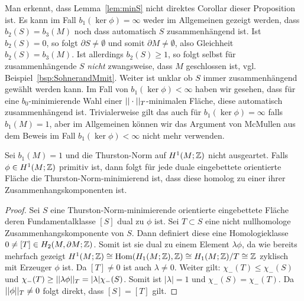 \begin{bem}
    Man erkennt, dass Lemma~\ref{lem:minS} nicht direktes Corollar dieser Proposition ist. Es kann im Fall $b_1(\ker\phi)=\infty$ weder im Allgemeinen gezeigt werden, dass $b_2(S)=b_3(M)$ noch dass automatisch $S$ zusammenhängend ist. Ist $b_2(S)=0$, so folgt $\partial S \neq \emptyset$ und somit $\partial M \neq \emptyset$, also Gleichheit $b_2(S)=b_3(M)$. Ist allerdings $b_2(S)\geq 1$, so folgt selbst für zusammenhängende $S$ \emph{nicht} zwangsweise, dass $M$ geschlossen ist, vgl.\,Beispiel~\ref{bsp:SohnerandMmit}. Weiter ist unklar ob $S$ immer zusammenhängend gewählt werden kann. Im Fall von $b_1(\ker\phi)<\infty$ haben wir gesehen, dass für eine $b_0$-minimierende Wahl einer $||\cdot||_T$-minimalen Fläche, diese automatisch zusammenhängend ist. Trivialerweise gilt das auch für $b_1(\ker\phi)=\infty$ falls $b_1(M)=1$, aber im Allgemeinen können wir das Argument von McMullen aus dem Beweis im Fall $b_1(\ker\phi)<\infty$ nicht mehr verwenden.
\end{bem}
\begin{lem}
    Sei $b_1(M)=1$ und die Thurston-Norm auf $H^1(M;\mathbb{Z})$ nicht ausgeartet. Falls $\phi \in H^1(M;\mathbb{Z})$ primitiv ist, dann folgt für jede duale eingebettete orientierte Fläche die Thurston-Norm-minimierend ist, dass diese homolog zu einer ihrer Zusammenhangskomponenten ist.
\end{lem}
\begin{proof}
    Sei $S$ eine Thurston-Norm-minimierende orientierte eingebettete Fläche deren Fundamentalklasse $[S]$ dual zu $\phi$ ist. Sei $T \subset S$ eine nicht nullhomologe Zusammenhangskomponente von $S$. Dann definiert diese eine Homologieklasse $0 \neq [T] \in H_2(M,\partial M;\mathbb{Z})$. Somit ist sie dual zu einem Element $\lambda \phi$, da wie bereits mehrfach gezeigt $H^1(M;\mathbb{Z})\cong \operatorname{Hom}(H_1(M;\mathbb{Z}),\mathbb{Z}) \cong H_1(M;\mathbb{Z})/T \cong \mathbb{Z}$ zyklisch mit Erzeuger $\phi$ ist. Da $[T]\neq 0$ ist auch $\lambda \neq 0$. Weiter gilt: $\chi_-(T) \leq \chi_-(S)$ und $\chi_-(T)\geq ||\lambda\phi||_T = |\lambda| \chi_-(S)$. Somit ist $|\lambda|=1$ und $\chi_-(S)=\chi_-(T)$. Da $||\phi||_T \neq 0$ folgt direkt, dass $[S]=[T]$ gilt. 
\end{proof}
